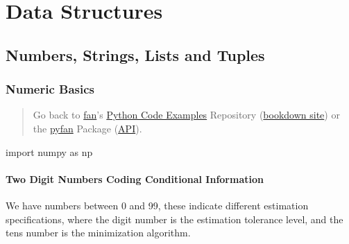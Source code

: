 \documentclass[
]{book}
\newenvironment{Shaded}{\begin{snugshade}}{\end{snugshade}}
\newcommand{\ImportTok}[1]{#1}
\newcommand{\NormalTok}[1]{#1}
\begin{document}
\hypertarget{data-structures}{%
\chapter{Data Structures}\label{data-structures}}

\hypertarget{numbers-strings-lists-and-tuples}{%
\section{Numbers, Strings, Lists and Tuples}\label{numbers-strings-lists-and-tuples}}

\hypertarget{numeric-basics}{%
\subsection{Numeric Basics}\label{numeric-basics}}

\begin{quote}
Go back to \href{http://fanwangecon.github.io/}{fan}'s \href{https://fanwangecon.github.io/Py4Econ/}{Python Code Examples} Repository (\href{https://fanwangecon.github.io/Py4Econ/bookdown}{bookdown site}) or the \href{https://pyfan.readthedocs.io/en/latest/}{pyfan} Package (\href{https://pyfan.readthedocs.io/en/latest/reference.html}{API}).
\end{quote}

\begin{Shaded}
\begin{Highlighting}[]
\ImportTok{import}\NormalTok{ numpy }\ImportTok{as}\NormalTok{ np}
\end{Highlighting}
\end{Shaded}

\hypertarget{two-digit-numbers-coding-conditional-information}{%
\subsubsection{Two Digit Numbers Coding Conditional Information}\label{two-digit-numbers-coding-conditional-information}}

We have numbers between 0 and 99, these indicate different estimation specifications, where the digit number is the estimation tolerance level, and the tens number is the minimization algorithm.
\end{document}
